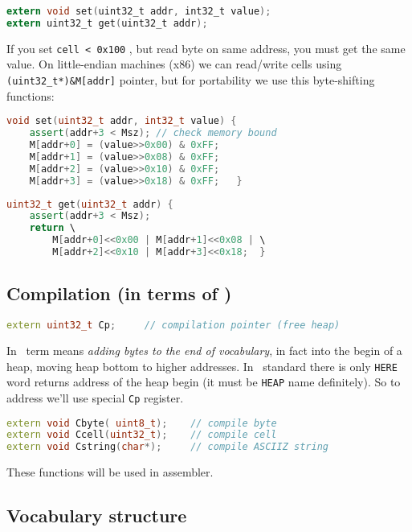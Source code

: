 \begin{lstlisting}[language=C]
extern void set(uint32_t addr, int32_t value);
extern uint32_t get(uint32_t addr);
\end{lstlisting}

If you set \verb|cell < 0x100| , but read byte on same address, you must get the
same value. On little-endian machines (x86) we can read/write cells using
\verb|(uint32_t*)&M[addr]| pointer, but for portability we use this
byte-shifting functions:

\begin{lstlisting}[language=C++]
void set(uint32_t addr, int32_t value) {
	assert(addr+3 < Msz); // check memory bound
	M[addr+0] = (value>>0x00) & 0xFF;
	M[addr+1] = (value>>0x08) & 0xFF;
	M[addr+2] = (value>>0x10) & 0xFF;
	M[addr+3] = (value>>0x18) & 0xFF;	}
\end{lstlisting}
\begin{lstlisting}[language=C++]
uint32_t get(uint32_t addr) {
	assert(addr+3 < Msz);
	return \
		M[addr+0]<<0x00 | M[addr+1]<<0x08 | \
		M[addr+2]<<0x10 | M[addr+3]<<0x18;	}
\end{lstlisting}

\subsection{Compilation (in terms of \F)}

\begin{lstlisting}[language=C++]
extern uint32_t Cp;		// compilation pointer (free heap)
\end{lstlisting}

In \F\ term  means \textit{adding bytes to the end of
vocabulary}, in fact into the begin of a heap, moving heap bottom to higher
addresses. In \F\ standard there is only \verb|HERE| word returns address of
the heap begin (it must be \verb|HEAP| name definitely). So to address we'll use
special \verb|Cp| register.

\begin{lstlisting}[language=C++]
extern void Cbyte( uint8_t);	// compile byte
extern void Ccell(uint32_t);	// compile cell
extern void Cstring(char*);		// compile ASCIIZ string
\end{lstlisting}

\noindent
These functions will be used in assembler.

\subsection{Vocabulary structure}\label{vocabulary}

